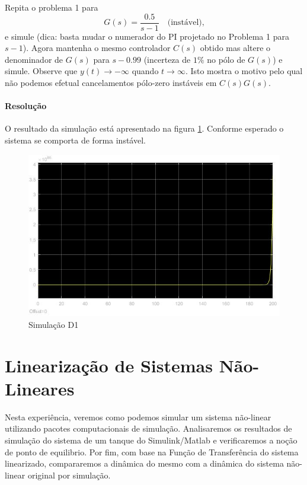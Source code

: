 \documentclass[
]{book}
\theoremstyle{definition}
\theoremstyle{definition}
\theoremstyle{definition}
\theoremstyle{remark}
\begin{document}
Repita o problema 1 para
\[
G(s) = \frac{0.5}{s-1} \quad \text{(instável),}
\]
e simule (dica: basta mudar o numerador do PI projetado no Problema 1 para \(s-1\)). Agora mantenha o mesmo controlador \(C(s)\) obtido mas altere o denominador de \(G(s)\) para \(s-0.99\) (incerteza de \(1\%\) no pólo de \(G(s)\)) e simule. Observe que \(y(t) \to -\infty\) quando \(t\to\infty\). Isto mostra o motivo pelo qual não podemos efetual cancelamentos pólo-zero instáveis em \(C(s)G(s)\).

\hypertarget{resoluuxe7uxe3o-15}{%
\subsubsection*{Resolução}\label{resoluuxe7uxe3o-15}}

O resultado da simulação está apresentado na figura \ref{fig:prob4A1}. Conforme esperado o sistema se comporta de forma instável.

\begin{figure}

{\centering \includegraphics[width=0.8\linewidth]{Imagens/Lab5/Resolução/prob4A1} 

}

\caption{Simulação D1}\label{fig:prob4A1}
\end{figure}

\hypertarget{lab6}{%
\chapter{Linearização de Sistemas Não-Lineares}\label{lab6}}

Nesta experiência, veremos como podemos simular um sistema não-linear utilizando pacotes computacionais de simulação. Analisaremos os resultados de simulação do sistema de um tanque do Simulink/Matlab e verificaremos a noção de ponto de equilibrio. Por fim, com base na Função de Transferência do sistema linearizado, compararemos a dinâmica do mesmo com a dinâmica do sistema não-linear original por simulação.
\end{document}
